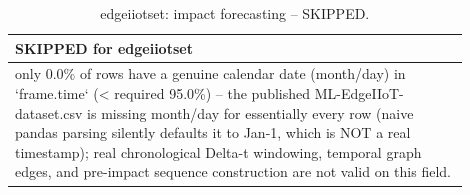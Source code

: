 \begin{table}[t]
\centering
\caption{edgeiiotset: impact forecasting -- SKIPPED.}
\label{tab:edgeiiotset_impact_forecasting}
\begin{tabular}{p{0.9\linewidth}}
\toprule
\textbf{SKIPPED for edgeiiotset} \\
\midrule
only 0.0\% of rows have a genuine calendar date (month/day) in `frame.time` (< required 95.0\%) -- the published ML-EdgeIIoT-dataset.csv is missing month/day for essentially every row (naive pandas parsing silently defaults it to Jan-1, which is NOT a real timestamp); real chronological Delta-t windowing, temporal graph edges, and pre-impact sequence construction are not valid on this field. \\
\bottomrule
\end{tabular}
\end{table}
